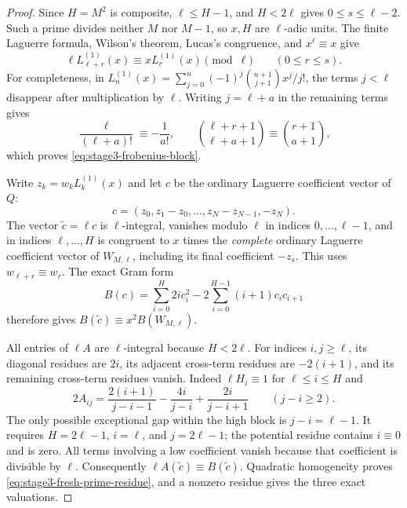\documentclass[11pt,a4paper]{article}
\theoremstyle{definition}
\theoremstyle{remark}
\begin{document}
\begin{proof}
Since $H=M^2$ is composite, $\ell\le H-1$, and $H<2\ell$
gives $0\le s\le\ell-2$.  Such a prime divides neither $M$ nor
$M-1$, so $x,H$ are $\ell$-adic units.  The finite Laguerre formula,
Wilson's theorem, Lucas's congruence, and $x^\ell\equiv x$ give
\begin{equation}
 \ell L_{\ell+r}^{(1)}(x)\equiv xL_r^{(1)}(x)\pmod\ell
 \qquad(0\le r\le s).
 \label{eq:stage3-frobenius-block}
\end{equation}
For completeness, in
$L_n^{(1)}(x)=\sum_{j=0}^n(-1)^j\binom{n+1}{j+1}x^j/j!$,
the terms $j<\ell$ disappear after multiplication by $\ell$.
Writing $j=\ell+a$ in the remaining terms gives
\[
 \frac{\ell}{(\ell+a)!}\equiv-\frac1{a!},\qquad
 \binom{\ell+r+1}{\ell+a+1}\equiv\binom{r+1}{a+1},
\]
which proves \eqref{eq:stage3-frobenius-block}.

Write $z_k=w_kL_k^{(1)}(x)$ and let $c$ be the ordinary Laguerre
coefficient vector of $Q$:
\[
 c=(z_0,z_1-z_0,\ldots,z_N-z_{N-1},-z_N).
\]
The vector $\widetilde c=\ell c$ is $\ell$-integral, vanishes
modulo $\ell$ in indices $0,\ldots,\ell-1$, and in indices
$\ell,\ldots,H$ is congruent to $x$ times the \emph{complete}
ordinary Laguerre coefficient vector of $W_{M,\ell}$, including
its final coefficient $-z_s$.  This uses $w_{\ell+r}\equiv w_r$.
The exact Gram form
\[
 B(c)=\sum_{i=0}^{H}2i c_i^2
       -2\sum_{i=0}^{H-1}(i+1)c_ic_{i+1}
\]
therefore gives $B(\widetilde c)\equiv x^2B(W_{M,\ell})$.

All entries of $\ell A$ are $\ell$-integral because $H<2\ell$.
For indices $i,j\ge\ell$, its diagonal residues are $2i$,
its adjacent cross-term residues are $-2(i+1)$, and its
remaining cross-term residues vanish.  Indeed
$\ell H_i\equiv1$ for $\ell\le i\le H$ and
\[
 2A_{ij}=\frac{2(i+1)}{j-i-1}
        -\frac{4i}{j-i}
        +\frac{2i}{j-i+1}\qquad(j-i\ge2).
\]
The only possible exceptional gap within the high block is
$j-i=\ell-1$.  It requires $H=2\ell-1$, $i=\ell$, and
$j=2\ell-1$; the potential residue contains $i\equiv0$
and is zero.  All terms involving a low coefficient vanish
because that coefficient is divisible by $\ell$.
Consequently $\ell A(\widetilde c)\equiv B(\widetilde c)$.
Quadratic homogeneity proves \eqref{eq:stage3-fresh-prime-residue},
and a nonzero residue gives the three exact valuations.
\end{proof}
\end{document}
